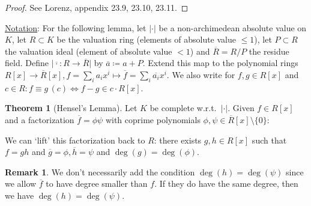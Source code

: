 \documentclass[openany]{amsbook}
\numberwithin{section}{chapter}
\theoremstyle{definition}
\newtheorem*{remark}{Remark}
\newtheorem{theorem}{Theorem}[chapter]
\begin{document}
\begin{proof}
    See Lorenz, appendix 23.9, 23.10, 23.11.
\end{proof}

\underline{Notation}: For the following lemma, let \(\vert \cdot \vert \) be a non-archimedean absolute value on \(K\), let \(R \subset K\) be the valuation ring (elements of absolute value \(\leq 1\)), let \(P \subset R\) the valuation ideal (element of absolute value \(<1\)) and \(\overline{R} = R / P\) the residue field. Define \(\vert \overline{\cdot} : R \to \overline{R} \vert \) by \(\overline{a} \coloneqq a+P\). Extend this map to the polynomial rings \(R[x] \to \overline{R} [x], f = \sum_{i} a_i x^i \mapsto \overline{f} = \sum_{i} \overline{a_i} x^i\). We also write for \(f,g\in R[x]\) and \(c\in R: f \equiv g \,(c) \iff f-g \in c\cdot R[x]\). 

\begin{theorem}
    [Hensel's Lemma] Let \(K\) be complete w.r.t.\ \(\vert \cdot \vert \). Given \(f\in R[x]\) and a factorization \(\overline{f} = \phi \psi\) with coprime polynomials \(\phi , \psi \in \overline{R}[x] \setminus \{ 0 \} \):

    We can `lift' this factorization back to \(R\): there exists \(g,h\in R[x]\) such that \(f=gh\) and \(\overline{g} = \phi , \overline{h} = \psi\) and \(\deg(g)=\deg(\phi)\).

\end{theorem}

\begin{remark}
    We don't necessarily add the condition \(\deg(h)=\deg(\psi)\) since we allow \(\overline{f}\) to have degree smaller than \(f\). If they do have the same degree, then we have \(\deg(h)=\deg(\psi)\).
\end{remark}
\end{document}
